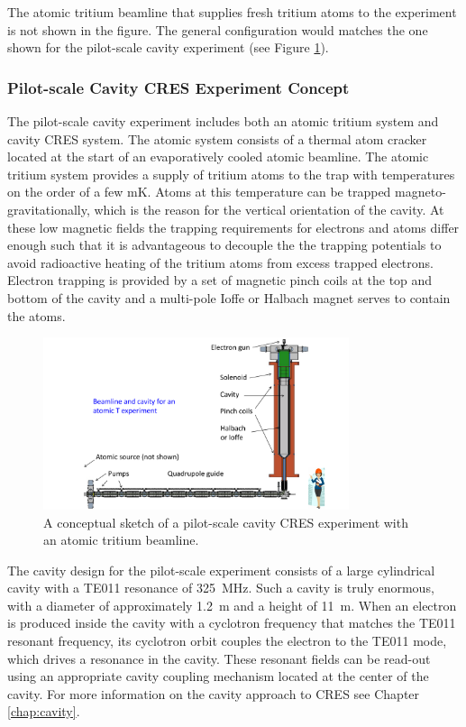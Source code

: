 The atomic tritium beamline that supplies fresh tritium atoms to the experiment is not shown in the figure. The general configuration would matches the one shown for the pilot-scale cavity experiment (see Figure \ref{fig:chap3-cavity-pilot-scale}).

\subsubsection*{Pilot-scale Cavity CRES Experiment Concept}

The pilot-scale cavity experiment includes both an atomic tritium system and cavity CRES system. The atomic system consists of a thermal atom cracker located at the start of an evaporatively cooled atomic beamline. The atomic tritium system provides a supply of tritium atoms to the trap with temperatures on the order of a few mK. Atoms at this temperature can be trapped magneto-gravitationally, which is the reason for the vertical orientation of the cavity. At these low magnetic fields the trapping requirements for electrons and atoms differ enough such that it is advantageous to decouple the the trapping potentials to avoid radioactive heating of the tritium atoms from excess trapped electrons. Electron trapping is provided by a set of magnetic pinch coils at the top and bottom of the cavity and a multi-pole Ioffe or Halbach magnet serves to contain the atoms.

\begin{figure}[htbp]
    \centering
    \includegraphics*[width=0.8\textwidth]{figs/Chapter-3/CavityAndBeamAndPerson2.pdf}
    \caption{\label{fig:chap3-cavity-pilot-scale} A conceptual sketch of a pilot-scale cavity CRES experiment with an atomic tritium beamline.}
\end{figure}

The cavity design for the pilot-scale experiment consists of a large cylindrical cavity with a TE011 resonance of 325~MHz. Such a cavity is truly enormous, with a diameter of approximately 1.2~m and a height of 11~m. When an electron is produced inside the cavity with a cyclotron frequency that matches the TE011 resonant frequency, its cyclotron orbit couples the electron to the TE011 mode, which drives a resonance in the cavity. These resonant fields can be read-out using an appropriate cavity coupling mechanism located at the center of the cavity. For more information on the cavity approach to CRES see Chapter \ref{chap:cavity}.

